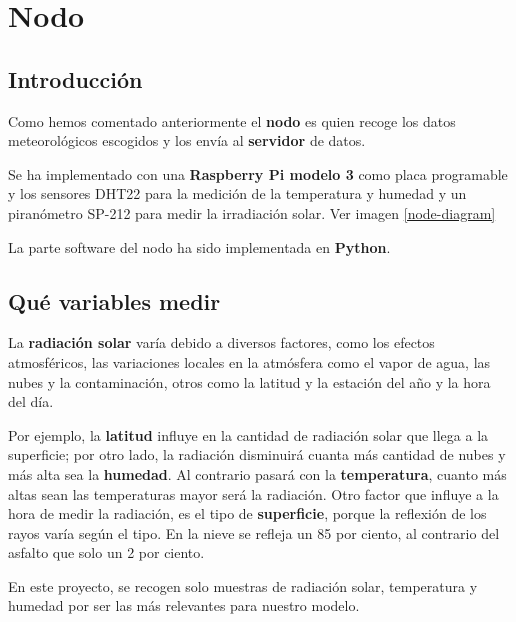 \cleardoublepage

\chapter{Nodo}
\label{makereference2}

\section{Introducción}
\label{makereference2.1}
Como hemos comentado anteriormente el \textbf{nodo} es quien recoge los datos meteorológicos escogidos y los envía al \textbf{servidor} de datos.

Se ha implementado con una \textbf{Raspberry Pi modelo 3} como placa programable y los sensores DHT22 para la medición de la temperatura y humedad y un piranómetro SP-212 para medir la irradiación solar. Ver imagen \ref{node-diagram}

La parte software del nodo ha sido implementada en \textbf{Python}.

\section{Qué variables medir}
\label{makereference2.2}

La \textbf{radiación solar} varía debido a diversos factores, como los efectos atmosféricos, las variaciones locales en la atmósfera como el vapor de agua, las nubes y la contaminación, otros como la latitud y la estación del año y la hora del día.


Por ejemplo, la \textbf{latitud} influye en la cantidad de radiación solar que llega a la superficie; por otro lado, la radiación disminuirá cuanta más cantidad de nubes y más alta sea la \textbf{humedad}. Al contrario pasará con la \textbf{temperatura}, cuanto más altas sean las temperaturas mayor será la radiación. Otro factor que influye a la hora de medir la radiación, es el tipo de \textbf{superficie}, porque la reflexión de los rayos varía según el tipo. En la nieve se refleja un 85 por ciento, al contrario del asfalto que solo un 2 por ciento.

En este proyecto, se recogen solo muestras de radiación solar, temperatura y humedad por ser las más relevantes para nuestro modelo.

